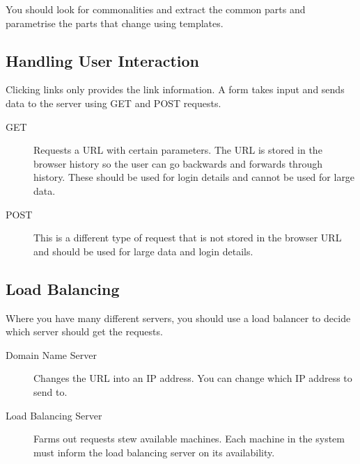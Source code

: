 You should look for commonalities and extract the common parts and parametrise the parts that change using templates.

\subsection{Handling User Interaction}\label{sub:handling_user_interaction}

Clicking links only provides the link information.
A form takes input and sends data to the server using GET and POST requests.

\begin{description}
    \item[GET] Requests a URL with certain parameters.
        The URL is stored in the browser history so the user can go backwards and forwards through history.
        These should be used for login details and cannot be used for large data.
    \item[POST] This is a different type of request that is not stored in the browser URL and should be used for large data and login details.
\end{description}

\subsection{Load Balancing}\label{sub:load_balancing}

Where you have many different servers, you should use a load balancer to decide which server should get the requests.
\begin{description}
    \item[Domain Name Server] Changes the URL into an IP address.
        You can change which IP address to send to.
    \item[Load Balancing Server] Farms out requests stew available machines.
        Each machine in the system must inform the load balancing server on its availability.
\end{description}

